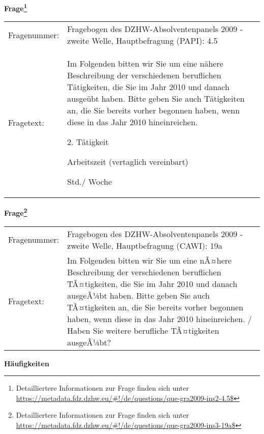 				\vspace*{0.5cm}
                \noindent\textbf{Frage\footnote{Detailliertere Informationen zur Frage finden sich unter
		              \url{https://metadata.fdz.dzhw.eu/\#!/de/questions/que-gra2009-ins2-4.5$}}}\\
				\begin{tabularx}{\hsize}{@{}lX}
					Fragenummer: &
					  Fragebogen des DZHW-Absolventenpanels 2009 - zweite Welle, Hauptbefragung (PAPI):
					  4.5
 \\
					Fragetext: & Im Folgenden bitten wir Sie um eine nähere Beschreibung der verschiedenen beruflichen Tätigkeiten, die Sie im Jahr 2010 und danach ausgeübt haben. Bitte geben Sie auch Tätigkeiten an, die Sie bereits vorher begonnen haben, wenn diese in das Jahr 2010 hineinreichen.\par  2. Tätigkeit\par  Arbeitszeit (vertaglich vereinbart)\par  Std./ Woche \\
				\end{tabularx}
				\vspace*{0.5cm}
                \noindent\textbf{Frage\footnote{Detailliertere Informationen zur Frage finden sich unter
		              \url{https://metadata.fdz.dzhw.eu/\#!/de/questions/que-gra2009-ins3-19a$}}}\\
				\begin{tabularx}{\hsize}{@{}lX}
					Fragenummer: &
					  Fragebogen des DZHW-Absolventenpanels 2009 - zweite Welle, Hauptbefragung (CAWI):
					  19a
 \\
					Fragetext: & Im Folgenden bitten wir Sie um eine nÃ¤here Beschreibung der verschiedenen beruflichen TÃ¤tigkeiten, die Sie im Jahr 2010 und danach ausgeÃ¼bt haben. Bitte geben Sie auch TÃ¤tigkeiten an, die Sie bereits vorher begonnen haben, wenn diese in das Jahr 2010 hineinreichen. / Haben Sie weitere berufliche TÃ¤tigkeiten ausgeÃ¼bt? \\
				\end{tabularx}





        		\vspace*{0.5cm}
                \noindent\textbf{Häufigkeiten}

